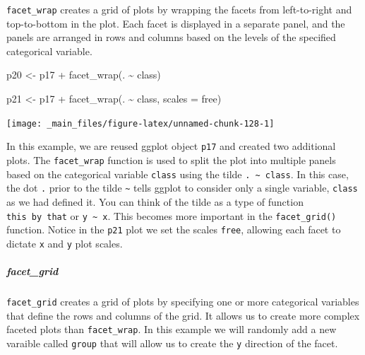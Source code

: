 \documentclass[
]{book}
\newenvironment{Shaded}{\begin{snugshade}}{\end{snugshade}}
\newcommand{\AttributeTok}[1]{\textcolor[rgb]{0.77,0.63,0.00}{#1}}
\newcommand{\FunctionTok}[1]{\textcolor[rgb]{0.00,0.00,0.00}{#1}}
\newcommand{\NormalTok}[1]{#1}
\newcommand{\OtherTok}[1]{\textcolor[rgb]{0.56,0.35,0.01}{#1}}
\newcommand{\SpecialCharTok}[1]{\textcolor[rgb]{0.00,0.00,0.00}{#1}}
\newcommand{\StringTok}[1]{\textcolor[rgb]{0.31,0.60,0.02}{#1}}
\begin{document}
\texttt{facet\_wrap} creates a grid of plots by wrapping the facets from left-to-right and top-to-bottom in the plot. Each facet is displayed in a separate panel, and the panels are arranged in rows and columns based on the levels of the specified categorical variable.

\begin{Shaded}
\begin{Highlighting}[]
\NormalTok{p20 }\OtherTok{\textless{}{-}}\NormalTok{ p17 }\SpecialCharTok{+} \FunctionTok{facet\_wrap}\NormalTok{(. }\SpecialCharTok{\textasciitilde{}}\NormalTok{ class)}

\NormalTok{p21 }\OtherTok{\textless{}{-}}\NormalTok{ p17 }\SpecialCharTok{+} \FunctionTok{facet\_wrap}\NormalTok{(. }\SpecialCharTok{\textasciitilde{}}\NormalTok{ class, }\AttributeTok{scales =} \StringTok{\textquotesingle{}free\textquotesingle{}}\NormalTok{)}
\end{Highlighting}
\end{Shaded}

\begin{center}\texttt{[image: \_main\_files/figure-latex/unnamed-chunk-128-1]} \end{center}

In this example, we are reused ggplot object \texttt{p17} and created two additional plots. The \texttt{facet\_wrap} function is used to split the plot into multiple panels based on the categorical variable \texttt{class} using the tilde \texttt{.\ \textasciitilde{}\ class}. In this case, the dot \texttt{.} prior to the tilde \texttt{\textasciitilde{}} tells ggplot to consider only a single variable, \texttt{class} as we had defined it. You can think of the tilde as a type of function \texttt{this\ \textquotesingle{}by\textquotesingle{}\ that} or \texttt{y\ \textasciitilde{}\ x}. This becomes more important in the \texttt{facet\_grid()} function. Notice in the \texttt{p21} plot we set the scales \texttt{free}, allowing each facet to dictate \texttt{x} and \texttt{y} plot scales.

\hypertarget{facet_grid}{%
\subparagraph*{facet\_grid}\label{facet_grid}}

\texttt{facet\_grid} creates a grid of plots by specifying one or more categorical variables that define the rows and columns of the grid. It allows us to create more complex faceted plots than \texttt{facet\_wrap}. In this example we will randomly add a new varaible called \texttt{group} that will allow us to create the \texttt{y} direction of the facet.
\end{document}
